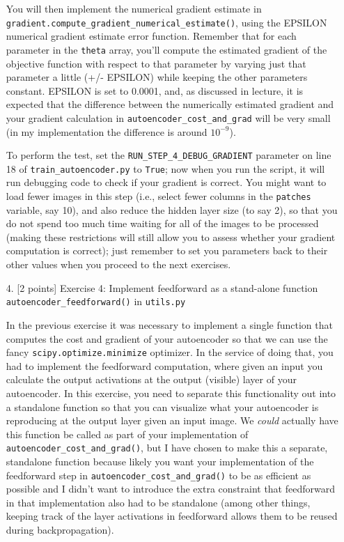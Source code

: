 \documentclass[10pt]{article}
\begin{document}
\begin{itemize}
You will then implement the numerical gradient estimate in \\ {\tt gradient.compute\_gradient\_numerical\_estimate()}, using the EPSILON numerical gradient estimate error function.  Remember that for each parameter in the {\tt theta} array, you'll compute the estimated gradient of the objective function with respect to that parameter by varying just that parameter a little (+/- EPSILON) while keeping the other parameters constant.  EPSILON is set to 0.0001, and, as discussed in lecture, it is expected that the difference between the numerically estimated gradient and your gradient calculation in {\tt autoencoder\_cost\_and\_grad} will be very small (in my implementation the difference is around $10^{-9}$).

To perform the test, set the {\tt RUN\_STEP\_4\_DEBUG\_GRADIENT} parameter on line 18 of {\tt train\_autoencoder.py} to {\tt True}; now when you run the script, it will run debugging code to check if your gradient is correct.  You might want to load fewer images in this step (i.e., select fewer columns in the {\tt patches} variable, say 10), and also reduce the hidden layer size (to say 2), so that you do not spend too much time waiting for all of the images to be processed (making these restrictions will still allow you to assess whether your gradient computation is correct); just remember to set you parameters back to their other values when you proceed to the next exercises.



\item[4.] [2 points]
Exercise 4: Implement feedforward as a stand-alone function {\tt autoencoder\_feedforward()} in {\tt utils.py}

In the previous exercise it was necessary to implement a single function that computes the cost and gradient of your autoencoder so that we can use the fancy {\tt scipy.optimize.minimize} optimizer.  In the service of doing that, you had to implement the feedforward computation, where given an input you calculate the output activations at the output (visible) layer of your autoencoder.  In this exercise, you need to separate this functionality out into a standalone function so that you can visualize what your autoencoder is reproducing at the output layer given an input image.  We {\em could} actually have this function be called as part of your implementation of {\tt autoencoder\_cost\_and\_grad()}, but I have chosen to make this a separate, standalone function because likely you want your implementation of the feedforward step in {\tt autoencoder\_cost\_and\_grad()} to be as efficient as possible and I didn't want to introduce the extra constraint that feedforward in that implementation also had to be standalone (among other things, keeping track of the layer activations in feedforward allows them to be reused during backpropagation).


\end{itemize}
\end{document}
